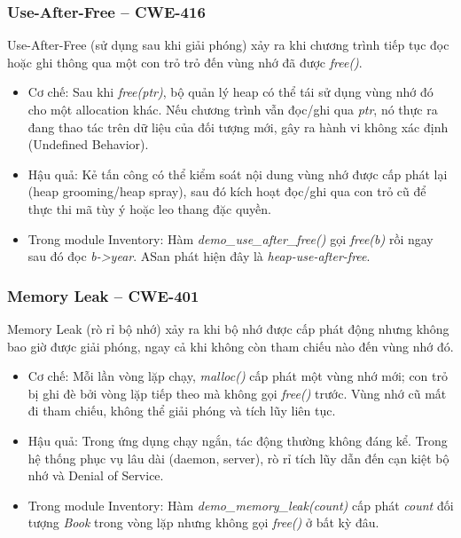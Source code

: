 \subsubsection{Use-After-Free -- CWE-416}

Use-After-Free (sử dụng sau khi giải phóng) xảy ra khi chương trình tiếp tục
đọc hoặc ghi thông qua một con trỏ trỏ đến vùng nhớ đã được \textit{free()}.

\begin{itemize}
    \item Cơ chế: Sau khi \textit{free(ptr)}, bộ quản lý heap có thể
          tái sử dụng vùng nhớ đó cho một allocation khác. Nếu chương trình vẫn
          đọc/ghi qua \textit{ptr}, nó thực ra đang thao tác trên dữ liệu của
          đối tượng mới, gây ra hành vi không xác định (Undefined Behavior).
    \item Hậu quả: Kẻ tấn công có thể kiểm soát nội dung vùng nhớ được
          cấp phát lại (heap grooming/heap spray), sau đó kích hoạt đọc/ghi qua
          con trỏ cũ để thực thi mã tùy ý hoặc leo thang đặc quyền.
    \item Trong module Inventory: Hàm \textit{demo\_use\_after\_free()}
          gọi \textit{free(b)} rồi ngay sau đó đọc \textit{b->year}. ASan phát
          hiện đây là \textit{heap-use-after-free}.
\end{itemize}

\subsubsection{Memory Leak -- CWE-401}

Memory Leak (rò rỉ bộ nhớ) xảy ra khi bộ nhớ được cấp phát động nhưng không
bao giờ được giải phóng, ngay cả khi không còn tham chiếu nào đến vùng nhớ đó.

\begin{itemize}
    \item Cơ chế: Mỗi lần vòng lặp chạy, \textit{malloc()} cấp phát
          một vùng nhớ mới; con trỏ bị ghi đè bởi vòng lặp tiếp theo mà không
          gọi \textit{free()} trước. Vùng nhớ cũ mất đi tham chiếu, không thể
          giải phóng và tích lũy liên tục.
    \item Hậu quả: Trong ứng dụng chạy ngắn, tác động thường không đáng
          kể. Trong hệ thống phục vụ lâu dài (daemon, server), rò rỉ tích lũy
          dẫn đến cạn kiệt bộ nhớ và Denial of Service.
    \item Trong module Inventory: Hàm \textit{demo\_memory\_leak(count)}
          cấp phát \textit{count} đối tượng \textit{Book} trong vòng lặp nhưng
          không gọi \textit{free()} ở bất kỳ đâu.
\end{itemize}

